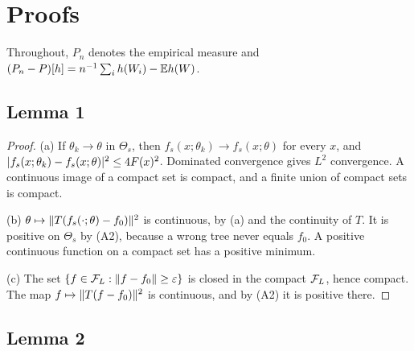 \section{Proofs}
\label{app:proofs}

Throughout, $P_n$ denotes the empirical measure and $(P_n - P)[h] = n^{-1}\sum_ih(W_i) - \mathbb{E} h(W)$.

\subsection{Lemma 1}

\begin{proof}
(a) If $\theta_k \to \theta$ in $\Theta_s$, then $f_s(x;\theta_k) \to f_s(x;\theta)$ for every $x$, and $\lvert f_s(x;\theta_k) - f_s(x;\theta)\rvert^2 \le 4F(x)^2$. Dominated convergence gives $L^2$ convergence. A continuous image of a compact set is compact, and a finite union of compact sets is compact.

(b) $\theta \mapsto \lVert T(f_s(\cdot;\theta) - f_0)\rVert^2$ is continuous, by (a) and the continuity of $T$. It is positive on $\Theta_s$ by (A2), because a wrong tree never equals $f_0$. A positive continuous function on a compact set has a positive minimum.

(c) The set $\{f \in \mathcal{F}_L : \lVert f - f_0\rVert \ge \varepsilon\}$ is closed in the compact $\mathcal{F}_L$, hence compact. The map $f \mapsto \lVert T(f - f_0)\rVert^2$ is continuous, and by (A2) it is positive there.
\end{proof}

\subsection{Lemma 2}

